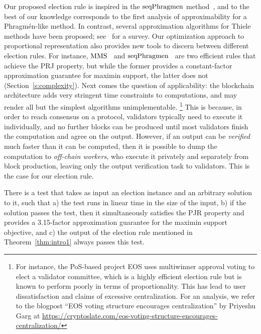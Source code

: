 Our proposed election rule is inspired in the $\operatorname{seqPhragmen}$ method~\cite{brill2017phragmen}, and to the best of our knowledge corresponds to the first analysis of approximability for a Phragm\'{e}n-like method. 
In contrast, several approximation algorithms for Thiele methods have been proposed; see~\cite{lackner2020approval} for a survey. 
%
Our optimization approach to proportional representation also provides new tools to discern between different election rules. For instance, $\operatorname{MMS}$~\cite{sanchez2016maximin} and $\operatorname{seqPhragmen}$~\cite{brill2017phragmen} are two efficient rules that achieve the PRJ property, but while the former provides a constant-factor approximation guarantee for maximin support, the latter does not (Section~\ref{s:complexity}). 
%
Next comes the question of applicability: the blockchain architecture adds very stringent time constraints to computations, and may render all but the simplest algorithms unimplementable.%
%
\footnote{For instance, the PoS-based project EOS uses multiwinner approval voting to elect a validator committee, which is a highly efficient election rule but is known to perform poorly in terms of proportionality. This has lead to user dissatisfaction and claims of excessive centralization. 
For an analysis, we refer to the blogpost ``EOS voting structure encourages centralization'' by Priyeshu Garg at \url{https://cryptoslate.com/eos-voting-structure-encourages-centralization/}} %
% 
This is because, in order to reach consensus on a protocol, validators typically need to execute it individually, and no further blocks can be produced until most validators finish the computation and agree on the output. 
However, if an output can be \emph{verified} much faster than it can be computed, then it is possible to dump the computation to \emph{off-chain workers}, who execute it privately and separately from block production, leaving only the output verification task to validators. This is the case for our election rule.

\begin{theorem}\label{thm:intro2}
There is a test that takes as input an election instance and an arbitrary solution to it, such that a) the test runs in linear time in the size of the input, b) if the solution passes the test, then it simultaneously satisfies the PJR property and provides a 3.15-factor approximation guarantee for the maximin support objective, and c) the output of the election rule mentioned in Theorem~\ref{thm:intro1} always passes this test.
\end{theorem}

